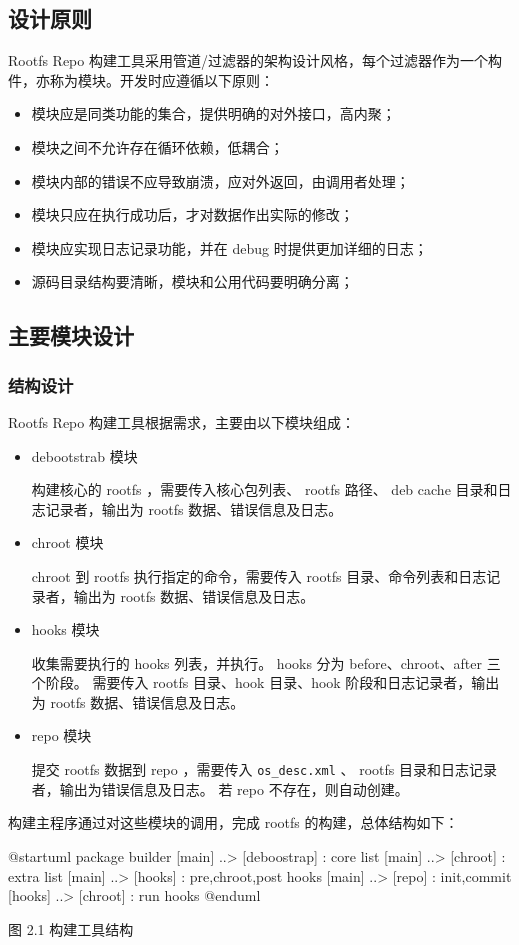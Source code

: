 \documentclass{utart}
\begin{document}
\subsection{设计原则}
Rootfs Repo 构建工具采用管道/过滤器的架构设计风格，每个过滤器作为一个构件，亦称为模块。开发时应遵循以下原则：
\begin{itemize}[leftmargin=4em]
\item 模块应是同类功能的集合，提供明确的对外接口，高内聚；
\item 模块之间不允许存在循环依赖，低耦合；
\item 模块内部的错误不应导致崩溃，应对外返回，由调用者处理；
\item 模块只应在执行成功后，才对数据作出实际的修改；
\item 模块应实现日志记录功能，并在 debug 时提供更加详细的日志；
\item 源码目录结构要清晰，模块和公用代码要明确分离；
\end{itemize}

\subsection{主要模块设计}
\subsubsection{结构设计}
Rootfs Repo 构建工具根据需求，主要由以下模块组成：
\begin{itemize}[leftmargin=4em]
\item debootstrab 模块

  构建核心的 rootfs ，需要传入核心包列表、 rootfs 路径、 deb cache 目录和日志记录者，输出为 rootfs 数据、错误信息及日志。
\item chroot 模块

  chroot 到 rootfs 执行指定的命令，需要传入 rootfs 目录、命令列表和日志记录者，输出为 rootfs 数据、错误信息及日志。
\item hooks 模块

  收集需要执行的 hooks 列表，并执行。 hooks 分为 before、chroot、after 三个阶段。
  需要传入 rootfs 目录、hook 目录、hook 阶段和日志记录者，输出为 rootfs 数据、错误信息及日志。
\item repo 模块

  提交 rootfs 数据到 repo ，需要传入 \texttt{os\_desc.xml} 、 rootfs 目录和日志记录者，输出为错误信息及日志。
  若 repo 不存在，则自动创建。
\end{itemize}

构建主程序通过对这些模块的调用，完成 rootfs 的构建，总体结构如下：
\begin{center}
  \begin{adjustbox}{scale=0.8}
    \begin{plantuml}
      @startuml
      package builder {
        [main] ..> [deboostrap] : core list
        [main] ..> [chroot] : extra list
        [main] ..> [hooks] : pre,chroot,post hooks
        [main] ..> [repo] : init,commit
        [hooks] ..> [chroot] : run hooks
      }
      @enduml
    \end{plantuml}
  \end{adjustbox}

  图 2.1 构建工具结构
\end{center}
\end{document}

